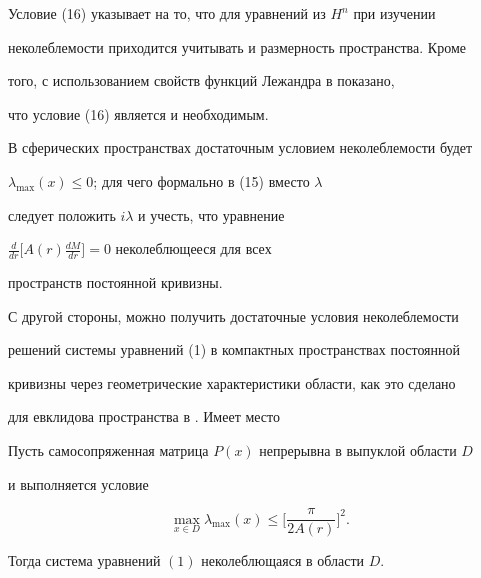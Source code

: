  


Условие (16) указывает на то, что для уравнений из $H^n$ при изучении 


неколеблемости приходится учитывать и размерность пространства. Кроме 


того, с использованием свойств функций Лежандра в \cite{5} показано, 


что условие (16) является и необходимым. 


 


В сферических пространствах достаточным условием неколеблемости будет 


$\lambda_{\max}(x)\le0$; для чего формально в (15) вместо $\lambda$ 


следует положить $i\lambda$ и учесть, что уравнение 


$\frac{d}{dr}\big[A(r)\frac{dM}{dr}\big]=0$ неколеблющееся для всех 


пространств постоянной кривизны. 


 


С другой стороны, можно получить достаточные условия неколеблемости 


решений системы уравнений (1) в компактных пространствах постоянной 


кривизны через геометрические характеристики области, как это сделано 


для евклидова пространства в \cite{7}. Имеет место 


 


\begin{thm} 


Пусть самосопряженная матрица $P(x)$ непрерывна в выпуклой области $D$ 


и выполняется условие 


\begin{equation} 


\max_{x\in D}\lambda_{\max}(x)\le\bigg[ 


\frac{\pi}{2A(r)}\bigg]^2.


\end{equation} 


Тогда система уравнений $(1)$ неколеблющаяся в области $D$. 


\end{thm} 


 


